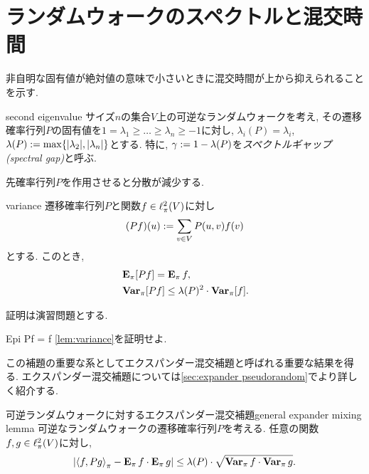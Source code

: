 \section{ランダムウォークのスペクトルと混交時間}
非自明な固有値が絶対値の意味で小さいときに混交時間が上から抑えられることを示す.
\begin{definition}{}{second eigenvalue}
    サイズ$n$の集合$V$上の可逆なランダムウォークを考え,
    その遷移確率行列$P$の固有値を$1=\lambda_1 \ge \dots \ge \lambda_n\ge -1$に対し,
    $\lambda_i(P)=\lambda_i$,
    $\lambda(P) \defeq \max\cbra{\abs{\lambda_2},\abs{\lambda_n}}$とする.
    特に, $\gamma\defeq 1-\lambda(P)$を\emph{スペクトルギャップ (spectral gap)}と呼ぶ.
\end{definition}
先確率行列$P$を作用させると分散が減少する.
\begin{lemma}{}{variance}
    遷移確率行列$P$と関数$f \in \pispace$に対し
    \[
        (Pf)(u) \defeq \sum_{v\in V} P(u,v)f(v)
    \]
    とする. このとき,
    \begin{align*}
         & \Epi[Pf] = \Epi f,                            \\
         & \Varpi[Pf] \le \lambda(P)^2 \cdot \Varpi [f].
    \end{align*}
\end{lemma}
証明は演習問題とする.
\begin{exercise}{}{Epi Pf = f}
    \cref{lem:variance}を証明せよ.
\end{exercise}
この補題の重要な系としてエクスパンダー混交補題と呼ばれる重要な結果を得る.
エクスパンダー混交補題については\cref{sec:expander pseudorandom}でより詳しく紹介する.
\begin{corollary}{可逆ランダムウォークに対するエクスパンダー混交補題}{general expander mixing lemma}
    可逆なランダムウォークの遷移確率行列$P$を考える.
    任意の関数$f,g\in\pispace$に対し,
    \[ \abs*{\piprod{f,Pg} - \Epi f \cdot \Epi g} \le \lambda(P)\cdot \sqrt{\Varpi f \cdot \Varpi g}.  \]
\end{corollary}
\begin{comment}
\begin{proof}
    \cref{thm:eigendecomposition}で得られる空間$\pispace$の正規直交基底$x_1,\dots,x_n$を考え,
    関数$f$をそれらの線形結合
    \[ f = \sum_{i=1}^n f_i x_i\]
    で表す (ここで$f_i = \piprod{f,x_i}$).
    ここで, $x_1 = \allone$なので$f_1 = \E_\pi f$なので,
    両辺に左から$P$を掛けて移項すると
    \[
        Pf - \Epi[f] \allone  = \sum_{i=2}^n f_i P x_i = \sum_{i=2}^n \lambda_i f_i x_i
    \]
    を得る.
    両辺の$\pinorm{\cdot}$をとると, ピタゴラスの定理より
    \begin{align*}
        \pinorm{Pf - \Epi[f]\allone}^2 & = \sum_{i=2}^n f_i^2 \lambda_i^2                  \\
                                       & \le \lambda(P)^2\cdot \sum_{i=2}^n f_i^2          \\
                                       & = \lambda(P)^2\cdot \pinorm{f - \Epi[f]\allone}^2 \\
                                       & = \lambda(P)^2\cdot \Varpi f
    \end{align*}
    を得る.
\end{proof}
\end{comment}
